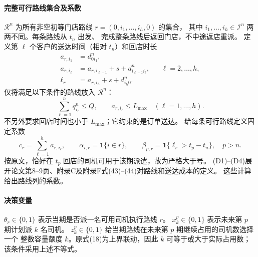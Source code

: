 \documentclass[UTF8,11pt]{ctexart}
\begin{document}
\paragraph{完整可行路线集合及系数}
$\mathcal R^n$ 为所有非空初等门店路线 $r=(0,i_1,\ldots,i_h,0)$ 的集合，
其中 $i_1,\ldots,i_h\in\mathcal I^n$ 两两不同。每条路线从 $t_n$ 出发、
完成整条路线后返回门店，不中途返店重派。
定义第 $\ell$ 个客户的送达时间（相对 $t_n$）和回店时长
\begin{align}
a_{r,i_1}&=d_{0i_1}^n,\nonumber\\
a_{r,i_\ell}&=a_{r,i_{\ell-1}}+s+d_{i_{\ell-1}i_\ell}^n,
&&\ell=2,\ldots,h,\tag{D1}\\
\ell_r&=a_{r,i_h}+s+d_{i_h0}^n.\tag{D2}
\end{align}
仅将满足以下条件的路线放入 $\mathcal R^n$：
\begin{equation}
\sum_{\ell=1}^h q_{i_\ell}^n\le Q,\qquad
 a_{r,i_\ell}\le L_{\max}\quad(\ell=1,\ldots,h).\tag{D3}
\end{equation}
不另外要求回店时间也小于 $L_{\max}$；它约束的是订单送达。
给每条可行路线定义固定系数
\begin{equation}
c_r=\sum_{\ell=1}^h a_{r,i_\ell},\qquad
\alpha_{i,r}=\mathbf1\{i\in r\},\qquad
\beta_{p,r}=\mathbf1\{\ell_r>t_p-t_n\},\quad p>n.\tag{D4}
\end{equation}
按原文，恰好在 $t_p$ 回店的司机可用于该期派遣，故为严格大于号。
(D1)--(D4)展开论文第8--9页、附录C及附录F式(43)--(44)对路线和送达成本的定义。
这些计算给出路线列的系数。

\paragraph{决策变量}
$\theta_r\in\{0,1\}$ 表示当期是否派一名可用司机执行路线 $r$。
$x_k^p\in\{0,1\}$ 表示未来第 $p$ 期计划派 $k$ 名司机。
$z_k^p\in\{0,1\}$ 给当期路线在未来第 $p$ 期继续占用的司机数选择一个
整数容量额度 $k$。原式(18)为上界联动，因此 $k$ 可等于或大于实际占用数；
该条件采用上述不等式。
\end{document}
